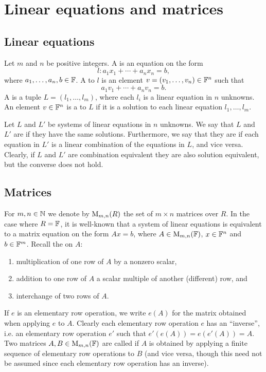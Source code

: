 \chapter{Linear equations and matrices}

\section{Linear equations}

Let $m$ and $n$ be positive integers. A  is an equation on the form
%
\begin{equation*}
    l \colon a_1 x_1 + \cdots + a_n x_n = b,
\end{equation*}
%
where $a_1, \ldots, a_n, b \in \mathbb{F}$. A  to $l$ is an element $v = (v_1, \ldots, v_n) \in \mathbb{F}^n$ such that
%
\begin{equation*}
    a_1 v_1 + \cdots + a_n v_n = b.
\end{equation*}
%
A  is a tuple $L = (l_1, \ldots, l_m)$, where each $l_i$ is a linear equation in $n$ unknowns. An element $v \in \mathbb{F}^n$ is a  to $L$ if it is a solution to each linear equation $l_1, \ldots, l_m$.

Let $L$ and $L'$ be systems of linear equations in $n$ unknowns. We say that $L$ and $L'$ are  if they have the same solutions. Furthermore, we say that they are  if each equation in $L'$ is a linear combination of the equations in $L$, and vice versa. Clearly, if $L$ and $L'$ are combination equivalent they are also solution equivalent, but the converse does not hold.


\section{Matrices}

For $m,n \in \mathbb{N}$ we denote by $\mathrm{M}_{m,n}(R)$ the set of $m \times n$ matrices over $R$. In the case where $R = \mathbb{F}$, it is well-known that a system of linear equations is equivalent to a matrix equation on the form $Ax = b$, where $A \in \mathrm{M}_{m,n}(\mathbb{F})$, $x \in \mathbb{F}^n$ and $b \in \mathbb{F}^m$. Recall the  on $A$:
%
\begin{enumerate}
    \item multiplication of one row of $A$ by a nonzero scalar,
    \item addition to one row of $A$ a scalar multiple of another (different) row, and
    \item interchange of two rows of $A$.
\end{enumerate}
%
If $e$ is an elementary row operation, we write $e(A)$ for the matrix obtained when applying $e$ to $A$. Clearly each elementary row operation $e$ has an \enquote{inverse}, i.e. an elementary row operation $e'$ such that $e'(e(A)) = e(e'(A)) = A$. Two matrices $A,B \in \mathrm{M}_{m,n}(\mathbb{F})$ are called  if $A$ is obtained by applying a finite sequence of elementary row operations to $B$ (and vice versa, though this need not be assumed since each elementary row operation has an inverse).

